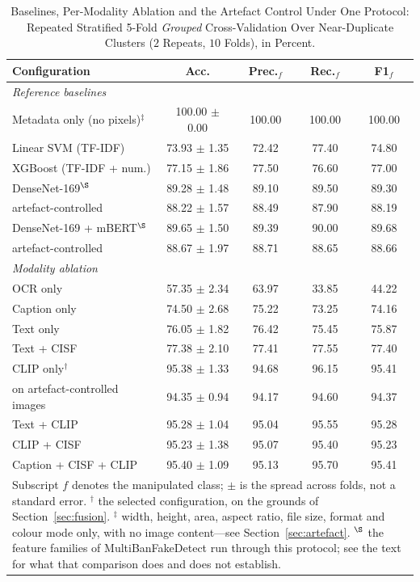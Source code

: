 \begin{table}[!tb]
\caption{Baselines, Per-Modality Ablation and the Artefact Control Under One
Protocol: Repeated Stratified 5-Fold \emph{Grouped} Cross-Validation Over
Near-Duplicate Clusters ($2$ Repeats, $10$ Folds), in Percent.}
\label{tab:ablation}
\centering
\setlength{\tabcolsep}{3.5pt}
\footnotesize
\begin{tabular}{lcccc}
\toprule
\textbf{Configuration} & \textbf{Acc.} & \textbf{Prec.$_{f}$} &
\textbf{Rec.$_{f}$} & \textbf{F1$_{f}$} \\
\midrule
\multicolumn{5}{l}{\emph{Reference baselines}} \\
Metadata only (no pixels)$^{\ddagger}$ & 100.00 $\pm$ 0.00 & 100.00 & 100.00 & 100.00 \\
Linear SVM (TF-IDF)     & 73.93 $\pm$ 1.35 & 72.42 & 77.40 & 74.80 \\
XGBoost (TF-IDF + num.) & 77.15 $\pm$ 1.86 & 77.50 & 76.60 & 77.00 \\
DenseNet-169$^{\S}$     & 89.28 $\pm$ 1.48 & 89.10 & 89.50 & 89.30 \\
\quad artefact-controlled & 88.22 $\pm$ 1.57 & 88.49 & 87.90 & 88.19 \\
DenseNet-169 + mBERT$^{\S}$ & 89.65 $\pm$ 1.50 & 89.39 & 90.00 & 89.68 \\
\quad artefact-controlled & 88.67 $\pm$ 1.97 & 88.71 & 88.65 & 88.66 \\
\midrule
\multicolumn{5}{l}{\emph{Modality ablation}} \\
OCR only              & 57.35 $\pm$ 2.34 & 63.97 & 33.85 & 44.22 \\
Caption only          & 74.50 $\pm$ 2.68 & 75.22 & 73.25 & 74.16 \\
Text only             & 76.05 $\pm$ 1.82 & 76.42 & 75.45 & 75.87 \\
Text + CISF           & 77.38 $\pm$ 2.10 & 77.41 & 77.55 & 77.40 \\
\midrule
CLIP only$^{\dagger}$ & 95.38 $\pm$ 1.33 & 94.68 & 96.15 & 95.41 \\
\quad on artefact-controlled images & 94.35 $\pm$ 0.94 & 94.17 & 94.60 & 94.37 \\
Text + CLIP           & 95.28 $\pm$ 1.04 & 95.04 & 95.55 & 95.28 \\
CLIP + CISF           & 95.23 $\pm$ 1.38 & 95.07 & 95.40 & 95.23 \\
Caption + CISF + CLIP & 95.40 $\pm$ 1.09 & 95.13 & 95.70 & 95.41 \\
\bottomrule
\multicolumn{5}{p{0.95\columnwidth}}{\footnotesize Subscript $f$ denotes the
manipulated class; $\pm$ is the spread across folds, not a standard error.
$^{\dagger}$ the selected configuration, on the grounds of
Section~\ref{sec:fusion}. $^{\ddagger}$ width, height, area, aspect ratio, file
size, format and colour mode only, with no image content---see
Section~\ref{sec:artefact}. $^{\S}$ the feature families of
MultiBanFakeDetect \cite{multibanfake} run through this protocol; see the text
for what that comparison does and does not establish.}
\end{tabular}
\end{table}


